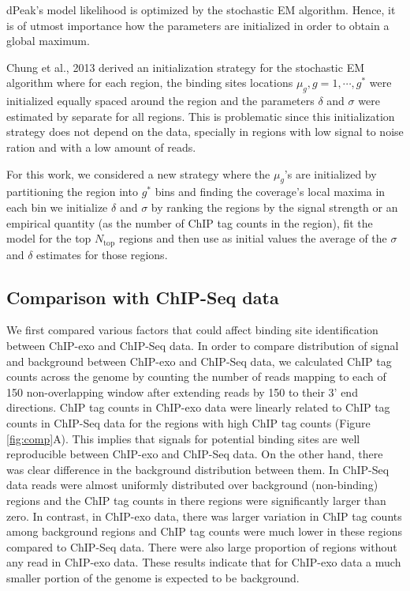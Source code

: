 \documentclass[11pt]{article}\usepackage[]{graphicx}\usepackage[]{color}
\begin{document}
dPeak's model likelihood is optimized by the stochastic EM
algorithm. Hence, it is of utmost importance how the parameters are
initialized in order to obtain a global maximum.

Chung et al., 2013 \cite{dpeak} derived an initialization strategy for
the stochastic EM algorithm where for each region, the binding sites
locations $\mu_g, g=1,\cdots,g^*$ were initialized equally spaced
around the region and the parameters $\delta$ and $\sigma$ were
estimated by separate for all regions. This is problematic since this
initialization strategy does not depend on the data, specially in
regions with low signal to noise ration and with a low amount of
reads.

For this work, we considered a new strategy where the $\mu_g$'s are
initialized by partitioning the region into $g^*$ bins and finding the
coverage's local maxima in each bin we initialize $\delta$ and
$\sigma$ by ranking the regions by the signal strength or an empirical
quantity (as the number of ChIP tag counts in the region), fit the
model for the top $N_{\text{top}}$ regions and then use as initial
values the average of the $\sigma$ and $\delta$ estimates for those
regions.

\subsection{Comparison with ChIP-Seq data}
\label{sec:comp_chipseq}



We first compared various factors that could affect binding site
identification between ChIP-exo and ChIP-Seq data. In order to compare
distribution of signal and background between ChIP-exo and ChIP-Seq
data, we calculated ChIP tag counts across the genome by counting the
number of reads mapping to each of 150 non-overlapping
window after extending reads by 150 to their 3' end
directions. ChIP tag counts in ChIP-exo data were linearly related to
ChIP tag counts in ChIP-Seq data for the regions with high ChIP tag
counts (Figure \ref{fig:comp}A). This implies that signals for
potential binding sites are well reproducible between ChIP-exo and
ChIP-Seq data. On the other hand, there was clear difference in the
background distribution between them. In ChIP-Seq data reads were
almost uniformly distributed over background (non-binding) regions and
the ChIP tag counts in there regions were significantly larger than
zero. In contrast, in ChIP-exo data, there was larger variation in
ChIP tag counts among background regions and ChIP tag counts were much
lower in these regions compared to ChIP-Seq data. There were also
large proportion of regions without any read in ChIP-exo data. These
results indicate that for ChIP-exo data a much smaller portion of the
genome is expected to be background.
\end{document}
